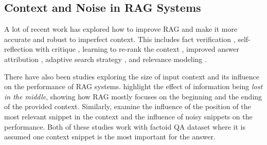 \subsection{Context and Noise in RAG Systems}


A lot of recent work has explored how to improve RAG and make it more accurate and robust to imperfect context. This includes fact verification \cite{li-etal-2024-llatrieval}, self-reflection with critique \cite{asai2024selfrag}, learning to re-rank the context \cite{yu2024rankrag}, improved answer attribution \cite{kdir24vladika}, adaptive search strategy \cite{jeong-etal-2024-adaptive}, and relevance modeling \cite{wang-etal-2024-rear}. 

There have also been studies exploring the size of input context and its influence on the performance of RAG systems. \citet{liu-etal-2024-lost} highlight the effect of information being \textit{lost in the middle}, showing how RAG mostly focuses on the beginning and the ending of the provided context. Similarly, \citet{cuconasu2024power} examine the influence of the position of the most relevant snippet in the context and the influence of noisy snippets on the performance. Both of these studies work with factoid QA dataset where it is assumed one context snippet is the most important for the answer.

